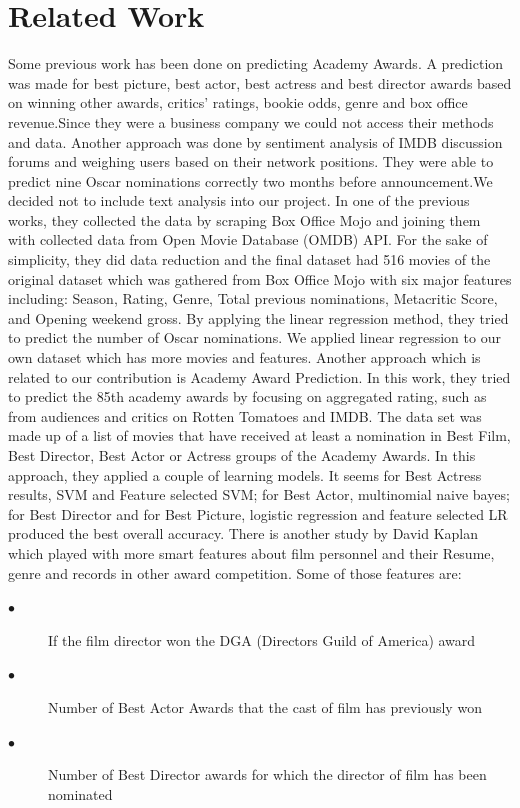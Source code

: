 \documentclass[journal,transmag]{IEEEtran}
\begin{document}
	\section{Related Work}
	Some previous work has been done on predicting Academy Awards. A prediction was made for best picture, best actor, best actress and best director awards based on winning other awards, critics' ratings, bookie odds, genre and box office revenue\cite{ref1}.Since they were a business company we could not access their methods and data.
Another approach was done by sentiment analysis of IMDB discussion forums and weighing users based on their network positions. They were able to predict nine Oscar nominations correctly two months before announcement\cite{ref2}.We decided not to include text analysis into our project.
In one of the previous works, they collected the data by scraping Box Office Mojo and joining them with collected data from Open Movie Database (OMDB) API. For the sake of simplicity, they did data reduction and the final dataset had 516 movies of the original dataset which was gathered from Box Office Mojo with six major features including: Season, Rating, Genre, Total previous nominations, Metacritic Score, and Opening weekend gross. By applying the linear regression method, they tried to predict the number of Oscar nominations\cite{ref3}. We applied linear regression to our own dataset which has more movies and features.
Another approach which is related to our contribution is Academy Award Prediction. In this work, they tried to predict the 85th academy awards by focusing on aggregated rating, such as from audiences and critics on Rotten Tomatoes and IMDB. The data set was made up of a list of movies that have received at least a nomination in Best Film, Best Director, Best Actor or Actress groups of the Academy Awards. In this approach, they applied a couple of learning models. It seems for Best Actress results, SVM and Feature selected SVM; for Best Actor, multinomial naive bayes; for Best Director and for Best Picture, logistic regression and feature selected LR produced the best overall accuracy\cite{ref4}.
There is another study by David Kaplan which played with more smart features about film personnel and their Resume, genre and records in other award competition. Some of those features are:
\begin{description}
  \item[$\bullet$ ] If the film director won the DGA (Directors Guild of America) award
  \item[$\bullet$ ] Number of Best Actor Awards that the cast of film has previously won
  \item[$\bullet$] Number of Best Director awards for which the director of film has been nominated
\end{description}
\end{document}
